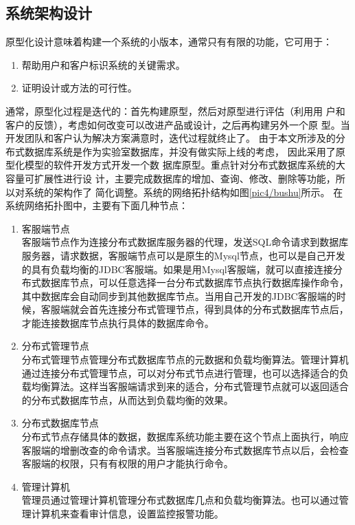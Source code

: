 \subsection{系统架构设计}
原型化设计意味着构建一个系统的小版本，通常只有有限的功能，它可用于：
\begin{enumerate}
	\item 帮助用户和客户标识系统的关键需求。
	\item 证明设计或方法的可行性。
\end{enumerate}
通常，原型化过程是迭代的：首先构建原型，然后对原型进行评估（利用用
户和客户的反馈），考虑如何改变可以改进产品或设计，之后再构建另外一个原
型。当开发团队和客户认为解决方案满意时，迭代过程就终止了。
由于本文所涉及的分布式数据库系统是作为实验室数据库，并没有做实际上线的考虑，
因此采用了原型化模型的软件开发方式开发一个数
据库原型。重点针对分布式数据库系统的大容量可扩展性进行设
计，主要完成数据库的增加、查询、修改、删除等功能，所以对系统的架构作了
简化调整。系统的网络拓扑结构如图\ref{pic4/bushu}所示。
在系统网络拓扑图中，主要有下面几种节点：
\begin{enumerate}
	\item 客服端节点\\
	客服端节点作为连接分布式数据库服务器的代理，发送SQL命令请求到数据库服务器，请求数据，客服端节点可以是原生的Mysql节点，也可以是自己开发的具有负载均衡的JDBC客服端。如果是用Mysql客服端，就可以直接连接分布式数据库节点，可以任意选择一台分布式数据库节点执行数据库操作命令，其中数据库会自动同步到其他数据库节点。当用自己开发的JDBC客服端的时候，客服端就会首先连接分布式管理节点，得到具体的分布式数据库节点后，才能连接数据库节点执行具体的数据库命令。
	\item 分布式管理节点\\
	分布式管理节点管理分布式数据库节点的元数据和负载均衡算法。管理计算机通过连接分布式管理节点，可以对分布式节点进行管理，也可以选择适合的负载均衡算法。这样当客服端请求到来的适合，分布式管理节点就可以返回适合的分布式数据库节点，从而达到负载均衡的效果。
	\item 分布式数据库节点\\
	分布式节点存储具体的数据，数据库系统功能主要在这个节点上面执行，响应客服端的增删改查的命令请求。当客服端连接分布式数据库节点以后，会检查客服端的权限，只有有权限的用户才能执行命令。
	\item 管理计算机\\
	管理员通过管理计算机管理分布式数据库几点和负载均衡算法。也可以通过管理计算机来查看审计信息，设置监控报警功能。
\end{enumerate}

